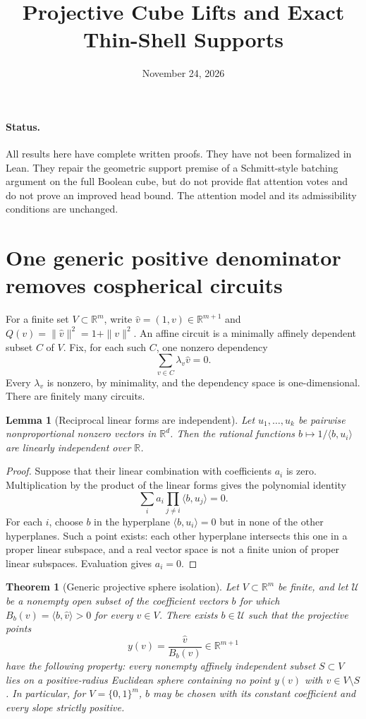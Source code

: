 \documentclass[11pt]{article}
\newtheorem{theorem}{Theorem}
\newtheorem{lemma}{Lemma}
\begin{document}
\title{Projective Cube Lifts and Exact Thin-Shell Supports}
\author{}
\date{November 24, 2026}
\maketitle

\paragraph{Status.}
All results here have complete written proofs. They have not been
formalized in Lean. They repair the geometric support premise of a
Schmitt-style batching argument on the full Boolean cube, but do not
provide flat attention votes and do not prove an improved head bound.
The attention model and its admissibility conditions are unchanged.

\section{One generic positive denominator removes cospherical circuits}

For a finite set $V\subset\mathbb R^m$, write
$\widehat v=(1,v)\in\mathbb R^{m+1}$ and
$Q(v)=\|\widehat v\|^2=1+\|v\|^2$.
An affine circuit is a minimally affinely dependent subset $C$ of $V$.
Fix, for each such $C$, one nonzero dependency
\[
 \sum_{v\in C}\lambda_v\widehat v=0.
\]
Every $\lambda_v$ is nonzero, by minimality, and the dependency space
is one-dimensional. There are finitely many circuits.

\begin{lemma}[Reciprocal linear forms are independent]
Let $u_1,\ldots,u_k$ be pairwise nonproportional nonzero vectors in
$\mathbb R^d$. Then the rational functions
$b\mapsto1/\langle b,u_i\rangle$ are linearly independent over
$\mathbb R$.
\end{lemma}
\begin{proof}
Suppose that their linear combination with coefficients $a_i$ is
zero. Multiplication by the product of the linear forms gives the
polynomial identity
\[
 \sum_i a_i\prod_{j\ne i}\langle b,u_j\rangle=0.
\]
For each $i$, choose $b$ in the hyperplane
$\langle b,u_i\rangle=0$ but in none of the other hyperplanes. Such
a point exists: each other hyperplane intersects this one in a proper
linear subspace, and a real vector space is not a finite union of
proper linear subspaces. Evaluation gives $a_i=0$.
\end{proof}

\begin{theorem}[Generic projective sphere isolation]
Let $V\subset\mathbb R^m$ be finite, and let $\mathcal U$ be a
nonempty open subset of the coefficient vectors $b$ for which
$B_b(v)=\langle b,\widehat v\rangle>0$ for every $v\in V$.
There exists $b\in\mathcal U$ such that the projective points
\[
 y(v)=\frac{\widehat v}{B_b(v)}\in\mathbb R^{m+1}
\]
have the following property: every nonempty affinely independent
subset $S\subset V$ lies on a positive-radius Euclidean sphere
containing no point $y(v)$ with $v\in V\setminus S$.
In particular, for $V=\{0,1\}^m$, $b$ may be chosen with its constant
coefficient and every slope strictly positive.
\end{theorem}
\end{document}
